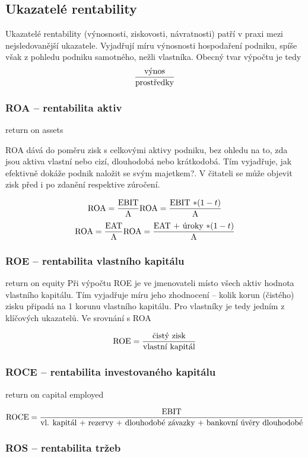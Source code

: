 \subsection{Ukazatelé rentability}

Ukazatelé rentability (výnosnosti, ziskovosti, návratnosti) patří v praxi mezi nejsledovanější ukazatele. Vyjadřují míru výnosnosti hospodaření podniku, spíše však z pohledu podniku samotného, nežli vlastníka. Obecný tvar výpočtu je tedy 
$$\dfrac{\text{výnos}}{\text{prostředky}}$$

\subsubsection{ROA -- rentabilita aktiv}

return on assets

ROA dává do poměru zisk s celkovými aktivy podniku, bez ohledu na to, zda jsou aktiva vlastní nebo cizí, dlouhodobá nebo krátkodobá. Tím vyjadřuje, jak efektivně dokáže podnik naložit se svým majetkem?. V čitateli se může objevit zisk před i po zdanění respektive zúročení.

$$\text{ROA} = \dfrac{\text{EBIT}}{\text{A}}  \text{ROA} = \dfrac{\text{EBIT $*(1-t)$}}{\text{A}}$$ 
$$\text{ROA} = \dfrac{\text{EAT}}{\text{A}}  \text{ROA} = \dfrac{\text{EAT $+$ úroky $*(1-t)$}}{\text{A}}$$

\subsubsection{ROE -- rentabilita vlastního kapitálu}

return on equity
Při výpočtu ROE je ve jmenovateli místo všech aktiv hodnota vlastního kapitálu. Tím vyjadřuje míru jeho zhodnocení -- kolik korun (čistého) zisku připadá na 1 korunu vlastního kapitálu. Pro vlastníky je tedy jedním z klíčových ukazatelů. Ve srovnání s ROA

$$\text{ROE} = \dfrac{\text{čistý zisk}}{\text{vlastní kapitál}}$$ 

\subsubsection{ROCE -- rentabilita investovaného kapitálu}

return on capital employed

$$\text{ROCE} = \dfrac{\text{EBIT}}{\text{vl. kapitál + rezervy + dlouhodobé závazky + bankovní úvěry dlouhodobé}}$$ 

\subsubsection{ROS -- rentabilita tržeb}

